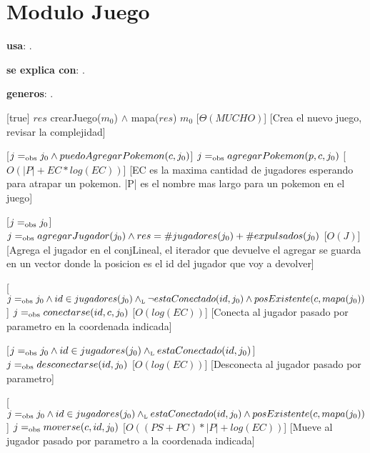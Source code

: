 \section{Modulo Juego}


\begin{Interfaz}

  \textbf{usa}: .

  \textbf{se explica con}: .

  \textbf{generos}: .

  [true]
  {$res$ \igobs crearJuego($m_0$) $\land$ mapa($res$) \igobs $m_0$}
  [$\Theta(MUCHO)$]
  [Crea el nuevo juego, revisar la complejidad]

  [$j =_{\mathrm{obs}} j_0 \land puedoAgregarPokemon(c, j_0)$]
  {$j =_{\mathrm{obs}} agregarPokemon(p, c, j_0)$}
  [$O(|P| + EC * log(EC))$]
  [EC es la maxima cantidad de jugadores esperando para atrapar un pokemon. |P| es el nombre mas largo para un pokemon en el juego]

  [$j =_{\mathrm{obs}} j_0$]
  {$j =_{\mathrm{obs}} agregarJugador(j_0) \land res = \#jugadores(j_0) + \#expulsados(j_0)$}
  [$O(J)$]
  [Agrega el jugador en el conjLineal, el iterador que devuelve el agregar se guarda en un vector donde la posicion es el id del jugador que voy a devolver]
  
  [$j =_{\mathrm{obs}} j_0 \land id \in jugadores(j_0) \land_{\mathrm{\scriptscriptstyle{L}}} \neg estaConectado(id, j_0) \land posExistente(c, mapa(j_0))$]
  {$j =_{\mathrm{obs}} conectarse(id, c, j_0)$}
  [$O(log(EC))$]
  [Conecta al jugador pasado por parametro en la coordenada indicada]
  
  [$j =_{\mathrm{obs}} j_0 \land id \in jugadores(j_0) \land_{\mathrm{\scriptscriptstyle{L}}} estaConectado(id, j_0)$]
  {$j =_{\mathrm{obs}} desconectarse(id, j_0)$}
  [$O(log(EC))$]
  [Desconecta al jugador pasado por parametro]
  
  [$j =_{\mathrm{obs}} j_0 \land id \in jugadores(j_0) \land_{\mathrm{\scriptscriptstyle{L}}} estaConectado(id, j_0) \land posExistente(c, mapa(j_0))$]
  {$j =_{\mathrm{obs}} moverse(c, id, j_0)$}
  [$O((PS + PC) * |P| + log(EC))$]
  [Mueve al jugador pasado por parametro a la coordenada indicada]


\end{Interfaz}

